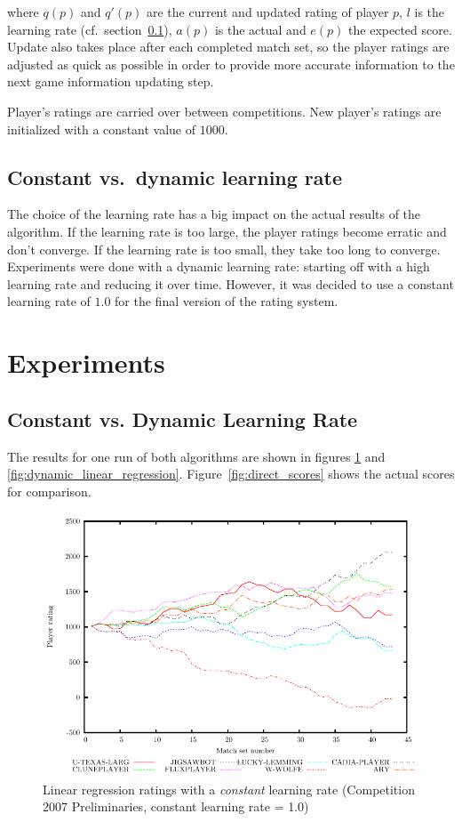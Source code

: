 \documentclass[a4paper,10pt]{article}
\begin{document}
where $q(p)$ and $q'(p)$ are the current and updated rating of player $p$, $l$
is the learning rate (cf.\ section~\ref{sec:constant_dynamic}), $a(p)$ is the
actual and $e(p)$ the expected score. Update also takes place after each
completed match set, so the player ratings are adjusted as quick as possible in
order to provide more accurate information to the next game information updating
step.

Player's ratings are carried over between competitions. New player's ratings are
initialized with a constant value of $1000$.


\subsection{Constant vs.\ dynamic learning rate}
\label{sec:constant_dynamic}

The choice of the learning rate has a big impact on the actual results of the
algorithm. If the learning rate is too large, the player ratings become erratic
and don't converge. If the learning rate is too small, they take too long to
converge. Experiments were done with a dynamic learning rate: starting off with
a high learning rate and reducing it over time. However, it was decided to use a
constant learning rate of $1.0$ for the final version of the rating system.

\section{Experiments}

\subsection{Constant vs. Dynamic Learning Rate}
The results for one run of both algorithms are shown in figures
\ref{fig:constant_linear_regression} and \ref{fig:dynamic_linear_regression}.
Figure~\ref{fig:direct_scores} shows the actual scores for comparison.

\begin{figure}
 \centering
 \includegraphics[width=\textwidth]{constant_linear_regression_1_0}
 \caption{Linear regression ratings with a \textit{constant} learning rate
(Competition 2007 Preliminaries, constant learning rate = 1.0)}
 \label{fig:constant_linear_regression}
\end{figure}
\end{document}
